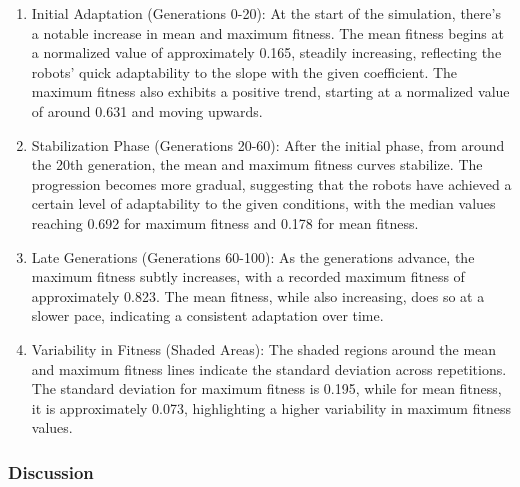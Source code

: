 \documentclass{sigchi}
\begin{document}
\begin{enumerate}
    \item Initial Adaptation (Generations 0-20): At the start of the simulation, there's a notable increase in mean and maximum fitness. The mean fitness begins at a normalized value of approximately 0.165, steadily increasing, reflecting the robots' quick adaptability to the slope with the given coefficient. The maximum fitness also exhibits a positive trend, starting at a normalized value of around 0.631 and moving upwards.
    \item Stabilization Phase (Generations 20-60): After the initial phase, from around the 20th generation, the mean and maximum fitness curves stabilize. The progression becomes more gradual, suggesting that the robots have achieved a certain level of adaptability to the given conditions, with the median values reaching 0.692 for maximum fitness and 0.178 for mean fitness.
    \item Late Generations (Generations 60-100): As the generations advance, the maximum fitness subtly increases, with a recorded maximum fitness of approximately 0.823. The mean fitness, while also increasing, does so at a slower pace, indicating a consistent adaptation over time.
    \item Variability in Fitness (Shaded Areas): The shaded regions around the mean and maximum fitness lines indicate the standard deviation across repetitions. The standard deviation for maximum fitness is 0.195, while for mean fitness, it is approximately 0.073, highlighting a higher variability in maximum fitness values.
\end{enumerate}


\subsubsection{Discussion}
\end{document}
